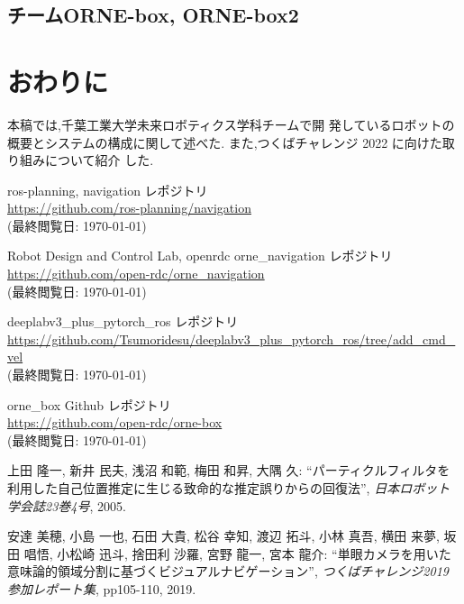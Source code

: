 \documentclass[uplatex, twocolumn, 9pt]{jsproceedings}
\begin{document}
\subsection{チームORNE-box, ORNE-box2}
\subsubsection{}

\section{おわりに}
本稿では,千葉工業大学未来ロボティクス学科チームで開
発しているロボットの概要とシステムの構成に関して述べた.
また,つくばチャレンジ 2022 に向けた取り組みについて紹介
した.

\footnotesize
\begin{thebibliography}{99}

ros-planning, navigation レポジトリ\\
\url{https://github.com/ros-planning/navigation}\\
(最終閲覧日: \today)

Robot Design and Control Lab, openrdc orne\_navigation レポジトリ\\
\url{https://github.com/open-rdc/orne_navigation}\\
(最終閲覧日: \today)

deeplabv3\_plus\_pytorch\_ros レポジトリ\\
\url{https://github.com/Tsumoridesu/deeplabv3_plus_pytorch_ros/tree/add_cmd_vel}\\
(最終閲覧日: \today)

orne\_box Github レポジトリ\\
\url{https://github.com/open-rdc/orne-box}\\
(最終閲覧日: \today)

上田 隆一, 新井 民夫, 浅沼 和範, 梅田 和昇, 大隅 久: ``パーティクルフィルタを利用した自己位置推定に生じる致命的な推定誤りからの回復法'', \textit{日本ロボット学会誌23巻4号}, 2005.

安達 美穂, 小島 一也, 石田 大貴, 松谷 幸知, 渡辺 拓斗, 小林 真吾, 横田 来夢, 坂田 唱悟, 小松崎 迅斗, 捨田利 沙羅, 宮野 龍一, 宮本 龍介: ``単眼カメラを用いた意味論的領域分割に基づくビジュアルナビゲーション'', \textit{つくばチャレンジ2019 参加レポート集}, pp105-110, 2019.

\end{thebibliography}
\normalsize
\end{document}
